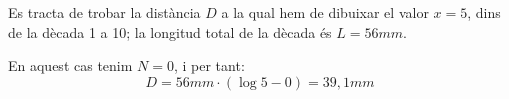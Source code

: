 \begin{exemple}
Es tracta de trobar la dist\`{a}ncia $D$ a la qual hem de dibuixar el valor $x=5$, dins de la
d\`{e}cada 1 a 10; la longitud total de la d\`{e}cada \'{e}s $L=56\unit{mm}$.

En aquest cas tenim $N=0$, i per tant:
\[
    D = 56\unit{mm} \cdot (\log 5 - 0)  = 39{,}1\unit{mm}
\]
\end{exemple}

